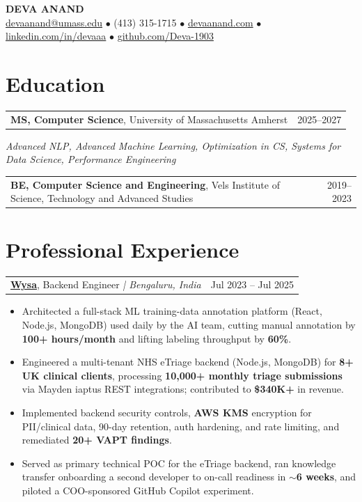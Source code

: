 \documentclass[letterpaper,11pt]{article}
\makeatletter
\newcommand{\eduItem}[3]{%
  \begin{tabular*}{\textwidth}{@{}l@{\extracolsep{\fill}}r@{}}
    \textbf{#1}, #2 & #3 \\
  \end{tabular*}\par
}
\newcommand{\expItem}[4]{%
  \vspace{3pt}
  \begin{tabular*}{\textwidth}{@{}l@{\extracolsep{\fill}}r@{}}
    \textbf{#1}, #2 \textit{| #3} & #4 \\
  \end{tabular*}\par\vspace{-2pt}
}
\makeatother
\begin{document}
\begin{center}
    {\fontsize{18}{20}\selectfont\bfseries DEVA ANAND}\\ \vspace{3pt}
    {\small
    \href{mailto:devaanand@umass.edu}{devaanand@umass.edu}
    \enspace$\bullet$\enspace
    (413) 315-1715
    \enspace$\bullet$\enspace
    \href{https://devaanand.com}{devaanand.com}
    \enspace$\bullet$\enspace
    \href{https://linkedin.com/in/devaaa/}{linkedin.com/in/devaaa}
    \enspace$\bullet$\enspace
    \href{https://github.com/Deva-1903}{github.com/Deva-1903}}
\end{center}
\vspace{-6pt}

\section{Education}
\eduItem{MS, Computer Science}{University of Massachusetts Amherst}{2025--2027}
{\small\textit{Advanced NLP, Advanced Machine Learning, Optimization in CS, Systems for Data Science, Performance Engineering}}\par
\vspace{3pt}
\eduItem{BE, Computer Science and Engineering}{Vels Institute of Science, Technology and Advanced Studies}{2019--2023}

\section{Professional Experience}

\expItem{\href{https://www.wysa.io}{Wysa}}{Backend Engineer}{Bengaluru, India}{Jul 2023 -- Jul 2025}
\begin{itemize}
  \item Architected a full-stack ML training-data annotation platform (React, Node.js, MongoDB) used daily by the AI team, cutting manual annotation by \textbf{100+ hours/month} and lifting labeling throughput by \textbf{60\%}.
  \item Engineered a multi-tenant NHS eTriage backend (Node.js, MongoDB) for \textbf{8+ UK clinical clients}, processing \textbf{10{,}000+ monthly triage submissions} via Mayden iaptus REST integrations; contributed to \textbf{\$340K+} in revenue.
  \item Implemented backend security controls, \textbf{AWS KMS} encryption for PII/clinical data, 90-day retention, auth hardening, and rate limiting, and remediated \textbf{20+ VAPT findings}.
  \item Served as primary technical POC for the eTriage backend, ran knowledge transfer onboarding a second developer to on-call readiness in \textbf{$\sim$6 weeks}, and piloted a COO-sponsored GitHub Copilot experiment.
\end{itemize}
\end{document}
